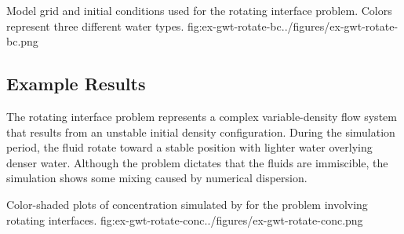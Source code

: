

\begin{StandardFigure}{
                                     Model grid and initial conditions used for the rotating interface problem.  Colors represent three different water types.
                                     }{fig:ex-gwt-rotate-bc}{../figures/ex-gwt-rotate-bc.png}
\end{StandardFigure}                                 


\subsection{Example Results}

The rotating interface problem represents a complex variable-density flow system that results from an unstable initial density configuration.  During the simulation period, the fluid rotate toward a stable position with lighter water overlying denser water.  Although the problem dictates that the fluids are immiscible, the \mf simulation shows some mixing caused by numerical dispersion.

\begin{StandardFigure}{
                                     Color-shaded plots of concentration simulated by \mf for the \cite{bakker2004} problem involving rotating interfaces.
                                     }{fig:ex-gwt-rotate-conc}{../figures/ex-gwt-rotate-conc.png}
\end{StandardFigure}                                 

